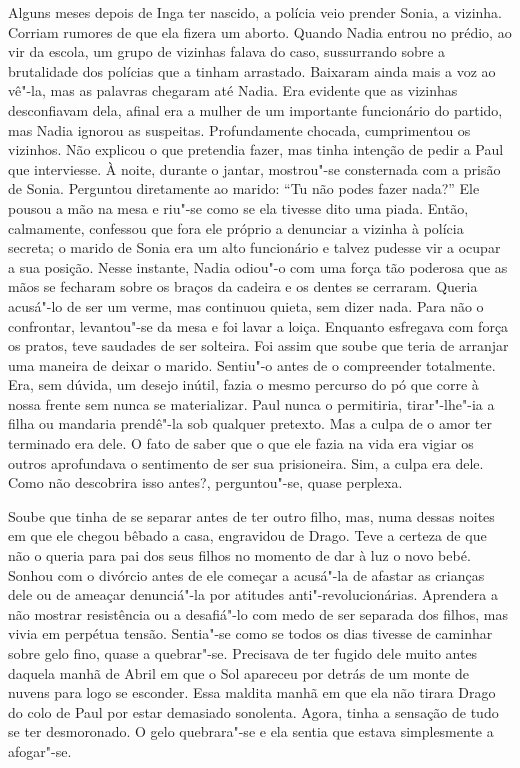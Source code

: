 Alguns meses depois de Inga ter nascido, a polícia veio prender Sonia, a
vizinha. Corriam rumores de que ela fizera um aborto. Quando Nadia
entrou no prédio, ao vir da escola, um grupo de vizinhas falava do caso,
sussurrando sobre a brutalidade dos polícias que a tinham arrastado.
Baixaram ainda mais a voz ao vê"-la, mas as palavras chegaram até
Nadia. Era evidente que as vizinhas desconfiavam dela, afinal era a
mulher de um importante funcionário do partido, mas Nadia ignorou as
suspeitas. Profundamente chocada, cumprimentou os vizinhos. Não
explicou o que pretendia fazer, mas tinha intenção de pedir a Paul que
interviesse. À noite, durante o jantar, mostrou"-se consternada com a
prisão de Sonia. Perguntou diretamente ao marido: ``Tu não podes fazer
nada?'' Ele pousou a mão na mesa e riu"-se como se ela tivesse dito uma
piada. Então, calmamente, confessou que fora ele próprio a denunciar a
vizinha à polícia secreta; o marido de Sonia era um alto funcionário e
talvez pudesse vir a ocupar a sua posição. Nesse instante, Nadia odiou"-o
com uma força tão poderosa que as mãos se fecharam sobre os braços da
cadeira e os dentes se cerraram. Queria acusá"-lo de ser um verme, mas
continuou quieta, sem dizer nada. Para não o confrontar, levantou"-se da
mesa e foi lavar a loiça. Enquanto esfregava com força os pratos, teve
saudades de ser solteira. Foi assim que soube que teria de arranjar uma
maneira de deixar o marido. Sentiu"-o antes de o compreender totalmente.
Era, sem dúvida, um desejo inútil, fazia o mesmo percurso do pó que
corre à nossa frente sem nunca se materializar. Paul nunca o permitiria,
tirar"-lhe"-ia a filha ou mandaria prendê"-la sob qualquer pretexto. Mas a culpa de o amor ter terminado era
dele. O fato de saber que o que ele fazia na vida era vigiar os outros
aprofundava o sentimento de ser sua prisioneira. Sim, a culpa era dele.
Como não descobrira isso antes?, perguntou"-se, quase perplexa.

Soube que tinha de se separar antes de ter outro filho, mas, numa dessas
noites em que ele chegou bêbado a casa, engravidou de Drago. Teve a
certeza de que não o queria para pai dos seus filhos no momento de dar à
luz o novo bebé. Sonhou com o divórcio antes de ele começar a acusá"-la de afastar as crianças dele ou de ameaçar denunciá"-la por atitudes
anti"-revolucionárias. Aprendera a não mostrar resistência ou a
desafiá"-lo com medo de ser separada dos filhos, mas vivia em perpétua
tensão. Sentia"-se como se todos os dias tivesse de caminhar sobre gelo
fino, quase a quebrar"-se. Precisava de ter fugido dele muito antes
daquela manhã de Abril em que o Sol apareceu por detrás de um monte de
nuvens para logo se esconder. Essa maldita manhã em que ela não tirara
Drago do colo de Paul por estar demasiado sonolenta. Agora, tinha a
sensação de tudo se ter desmoronado. O gelo quebrara"-se e ela sentia que
estava simplesmente a afogar"-se.



